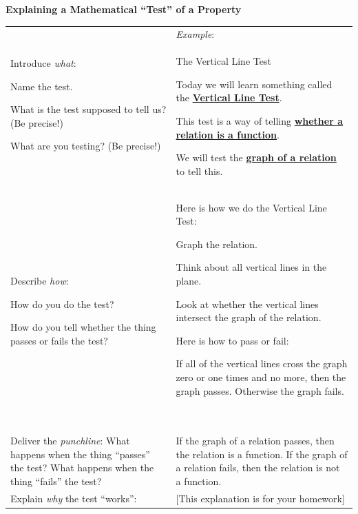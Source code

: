 \documentclass[11pt]{article}
\renewcommand\emph[1]{\underline{\bf{#1}}} %
\theoremstyle{definition}
\begin{document}
\begin{mdframed}
\begin{center}
{\bf Explaining a Mathematical ``Test'' of a Property}
\end{center}
\begin{tabular}{|L{2.2in}|L{3.7in}|}
\hline
	& {\it Example}: \\ 
Introduce {\it what}:	
	\begin{itemize*}
	\item Name the test.
	\item What is the test supposed to tell us? (Be precise!) 
	\item What are you testing? (Be precise!) 
	\end{itemize*} \vspace*{-12pt}$\;$
	& 
	The Vertical Line Test
	\begin{itemize*}
	\item	Today we will learn something called the \emph{Vertical Line Test}. 	
	\item This test is a way of telling \emph{whether a relation is a function}.
	\item We will test the \emph{graph of a relation} to tell this.
	\end{itemize*}
	\\ \hline 
Describe {\it how}:
	\begin{itemize*}
	\item How do you do the test?
	\item How do you tell whether the thing passes or fails the test?
	\end{itemize*}
	& 
	Here is how we do the Vertical Line Test: 
	\begin{itemize*}
	\item Graph the relation.
	\item Think about all vertical lines in the plane. 
	
		 Look at whether the vertical lines intersect the graph of the relation.
	\end{itemize*}
	
	Here is how to pass or fail:
	\begin{itemize*}
	\item If all of the vertical lines cross the graph zero or one times and no more, then the graph passes. 
		Otherwise the graph fails.
	\end{itemize*} \vspace*{-12pt}$\;$
	\\ \hline 
Deliver the {\it punchline}: What happens when the thing ``passes'' the test? What happens when the thing ``fails'' the test?
	& 
	If the graph of a relation passes, then the relation is a function. If the graph of a relation fails, then the relation is not a function. 
	 \\ \hline 
Explain {\it why} the test ``works'': 
	& 
	[This explanation is for your homework] \\ \hline 
\end{tabular}
\end{mdframed}
\end{document}
